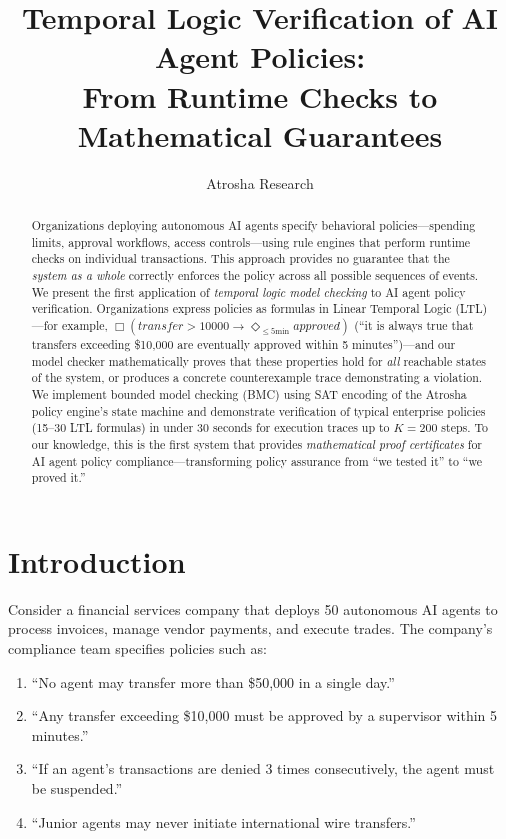 \documentclass{llncs}
\title{Temporal Logic Verification of AI Agent Policies:\\ From Runtime Checks to Mathematical Guarantees}
\author{Atrosha Research}
\institute{Atrosha Labs}
\begin{document}
\maketitle

\begin{abstract}
Organizations deploying autonomous AI agents specify behavioral policies---spending limits, approval workflows, access controls---using rule engines that perform runtime checks on individual transactions. This approach provides no guarantee that the \textit{system as a whole} correctly enforces the policy across all possible sequences of events. We present the first application of \textit{temporal logic model checking} to AI agent policy verification. Organizations express policies as formulas in Linear Temporal Logic (LTL)---for example, $\Box(\textit{transfer} > 10000 \rightarrow \Diamond_{\leq 5\text{min}} \textit{approved})$ (``it is always true that transfers exceeding \$10,000 are eventually approved within 5 minutes'')---and our model checker mathematically proves that these properties hold for \textit{all} reachable states of the system, or produces a concrete counterexample trace demonstrating a violation. We implement bounded model checking (BMC) using SAT encoding of the Atrosha policy engine's state machine and demonstrate verification of typical enterprise policies (15--30 LTL formulas) in under 30 seconds for execution traces up to $K=200$ steps. To our knowledge, this is the first system that provides \textit{mathematical proof certificates} for AI agent policy compliance---transforming policy assurance from ``we tested it'' to ``we proved it.''
\end{abstract}

\section{Introduction}

Consider a financial services company that deploys 50 autonomous AI agents to process invoices, manage vendor payments, and execute trades. The company's compliance team specifies policies such as:

\begin{enumerate}
    \item ``No agent may transfer more than \$50,000 in a single day.''
    \item ``Any transfer exceeding \$10,000 must be approved by a supervisor within 5 minutes.''
    \item ``If an agent's transactions are denied 3 times consecutively, the agent must be suspended.''
    \item ``Junior agents may never initiate international wire transfers.''
\end{enumerate}
\end{document}
